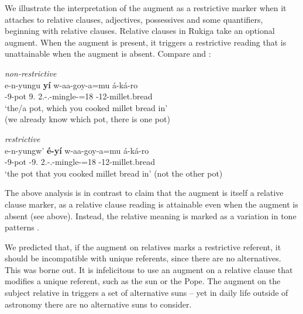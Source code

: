 \documentclass[output=paper]{langscibook}
\begin{document}
We illustrate the interpretation of the augment as a restrictive marker when it attaches to relative clauses, adjectives, possessives and some quantifiers, beginning with relative clauses. Relative clauses in Rukiga take an optional augment. When the augment is present, it triggers a restrictive reading that is unattainable when the augment is absent. Compare  and :
\largerpage[-1]
\pagebreak

\ea
\label{bkm:Ref113525219}\citep[1288]{AsiimweEtAl2023}
\ea
\label{bkm:Ref113525219:a}
\textit{non-restrictive}\\
\gll
e-n-yungu  \textbf{yí}  w-aa-goy-a=mu  á-ká-ro\\
\AUG{}-9-pot  9\REL{}.\PRO{}  2\SG{}.\SM{}-\N{}.\PST{}-mingle-\FV{}=18  \AUG{}-12-millet.bread\\
\glt
    \glt ‘the/a pot, which you cooked millet bread in’ \\
(we already know which pot, there is one pot)


\ex
\label{bkm:Ref113525219:b}
\textit{restrictive}\\
\gll
e-n-yungw’  \textbf{é-yí}  w-aa-goy-a=mu  á-ká-ro\\
\AUG{}-9-pot  \AUG{}-9\REL{}.\PRO{}  2\SG{}.\SM{}-\N{}.\PST{}-mingle-\FV{}=18  \AUG{}-12-millet.bread\\
\glt
‘the pot that you cooked millet bread in’ (not the other pot)\\


    \z
\z


The above analysis is in contrast to  claim that the augment is itself a relative clause marker, as a relative clause reading is attainable even when the augment is absent (see  above). Instead, the relative meaning is marked as a variation in tone patterns \citep[see][]{Asiimwe2019}.

We predicted that, if the augment on relatives marks a restrictive referent, it should be incompatible with unique referents, since there are no alternatives. This was borne out. It is infelicitous to use an augment on a relative clause that modifies a unique referent, such as the sun or the Pope. The augment on the subject relative in  triggers a set of alternative suns – yet in daily life outside of astronomy there are no alternative suns to consider.
\end{document}
